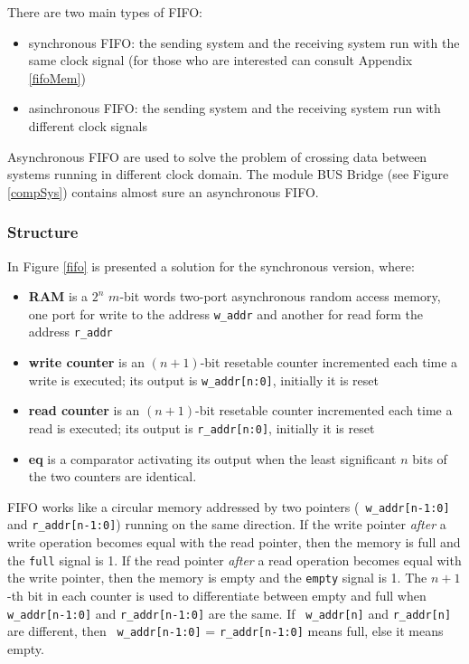 There are two main types of FIFO:
\begin{itemize}
    \item synchronous FIFO: the sending system and the receiving system run with the same clock signal (for those who are interested can consult Appendix \ref{fifoMem})
    \item asinchronous FIFO: the sending system and the receiving system run with different  clock signals
\end{itemize}
Asynchronous FIFO are used to solve the problem of crossing data between systems running in different clock domain. The module BUS Bridge (see Figure \ref{compSys}) contains almost sure an asynchronous FIFO.

\subsubsection{Structure}

In Figure \ref{fifo} is presented a solution for the synchronous
version, where:


\begin{itemize}
    \item {\bf RAM} is a $2^{n}$ $m$-bit words two-port asynchronous random access memory, one
    port for write to the address {\tt w\_addr} and another for
    read form the address {\tt r\_addr}
    \item {\bf write counter} is an $(n+1)$-bit resetable counter incremented
    each time a write is executed; its output is {\tt w\_addr[n:0]}, initially
    it is reset
    \item {\bf read counter} is an $(n+1)$-bit resetable counter incremented
    each time a read is executed; its output is {\tt r\_addr[n:0]}, initially it is reset
    \item {\bf eq} is a comparator activating its output when
    the least significant $n$ bits of the two counters are
    identical.
\end{itemize}

FIFO works like a circular memory addressed by two pointers ({\tt
w\_addr[n-1:0]} and {\tt r\_addr[n-1:0]}) running on the same
direction. If the write pointer {\em after} a write operation
becomes equal with the read pointer, then the memory is  full and
the {\tt full} signal is 1. If the read pointer {\em after} a read
operation becomes equal with the write pointer, then the memory is
empty and the {\tt empty} signal is 1. The $n+1$-th bit in each
counter is used to differentiate between empty and full when {\tt
w\_addr[n-1:0]} and {\tt r\_addr[n-1:0]} are the same. If {\tt
w\_addr[n]} and {\tt r\_addr[n]} are different, then {\tt
w\_addr[n-1:0]} = {\tt r\_addr[n-1:0]} means full, else it means
empty.

